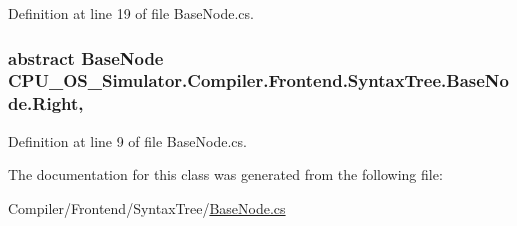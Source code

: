 Definition at line 19 of file Base\+Node.\+cs.

\hypertarget{class_c_p_u___o_s___simulator_1_1_compiler_1_1_frontend_1_1_syntax_tree_1_1_base_node_a488735e2d5ee9a31a1ee3bdb6742c06d}{}
\subsubsection[{Right}]{\setlength{\rightskip}{0pt plus 5cm}abstract {\bf Base\+Node} C\+P\+U\+\_\+\+O\+S\+\_\+\+Simulator.\+Compiler.\+Frontend.\+Syntax\+Tree.\+Base\+Node.\+Right\hspace{0.3cm}{\ttfamily [get]}, {\ttfamily [set]}}\label{class_c_p_u___o_s___simulator_1_1_compiler_1_1_frontend_1_1_syntax_tree_1_1_base_node_a488735e2d5ee9a31a1ee3bdb6742c06d}


Definition at line 9 of file Base\+Node.\+cs.



The documentation for this class was generated from the following file\+:\begin{DoxyCompactItemize}
\item 
Compiler/\+Frontend/\+Syntax\+Tree/\hyperlink{_base_node_8cs}{Base\+Node.\+cs}\end{DoxyCompactItemize}
